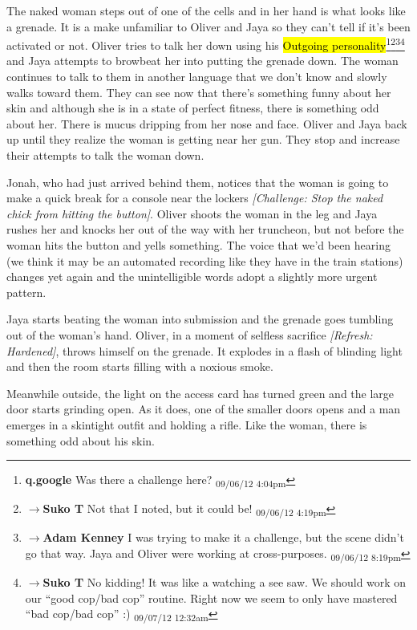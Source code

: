 The naked woman steps out of one of the cells and in her hand is what looks like a grenade.  It is a make unfamiliar to Oliver and Jaya so they can't tell if it's been activated or not.  Oliver tries to talk her down using his \hl{Outgoing personality}\footnote{\textbf{q.google }Was there a challenge here? \textsubscript{09/06/12 4:04pm}}\footnote{$\rightarrow$\textbf{Suko T }Not that I noted, but it could be! \textsubscript{09/06/12 4:19pm}}\footnote{$\rightarrow$\textbf{Adam Kenney }I was trying to make it a challenge, but the scene didn't go that way.  Jaya and Oliver were working at cross-purposes. \textsubscript{09/06/12 8:19pm}}\footnote{$\rightarrow$\textbf{Suko T }No kidding!  It was like a watching a see saw.  We should work on our ``good cop/bad cop'' routine.  Right now we seem to only have mastered ``bad cop/bad cop'' :) \textsubscript{09/07/12 12:32am}} and Jaya attempts to browbeat her into putting the grenade down.  The woman continues to talk to them in another language that we don't know and slowly walks toward them.  They can see now that there's something funny about her skin and although she is in a state of perfect fitness, there is something odd about her.  There is mucus dripping from her nose and face.  Oliver and Jaya back up until they realize the woman is getting near her gun.  They stop and increase their attempts to talk the woman down.  



Jonah, who had just arrived behind them, notices that the woman is going to make a quick break for a console near the lockers \textit{{[}Challenge: Stop the naked chick from hitting the button{]}}.  Oliver shoots the woman in the leg and Jaya rushes her and knocks her out of the way with her truncheon, but not before the woman hits the button and yells something.  The voice that we'd been hearing (we think it may be an automated recording like they have in the train stations) changes yet again and the unintelligible words adopt a slightly more urgent pattern.



Jaya starts beating the woman into submission and the grenade goes tumbling out of the woman's hand.  Oliver, in a moment of selfless sacrifice \textit{{[}Refresh: Hardened{]}}, throws himself on the grenade.  It explodes in a flash of blinding light and then the room starts filling with a noxious smoke.



Meanwhile outside, the light on the access card has turned green and the large door starts grinding open.  As it does, one of the smaller doors opens and a man emerges in a skintight outfit and holding a rifle.  Like the woman, there is something odd about his skin.



